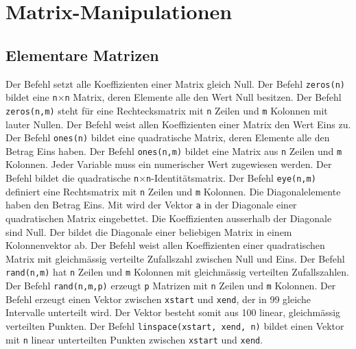 \section{Matrix-Manipulationen}
\subsection{Elementare Matrizen}
Der Befehl  setzt alle Koeffizienten einer Matrix gleich Null. Der Befehl {\color{red}\texttt{zeros(n)}} bildet eine \texttt{n$\times$n} Matrix, deren Elemente alle den Wert Null besitzen. Der Befehl {\color{red}\texttt{zeros(n,m)}} steht für eine Rechtecksmatrix mit \texttt{n} Zeilen und \texttt{m} Kolonnen mit lauter Nullen.
\newline\newline
Der Befehl  weist allen Koeffizienten einer Matrix den Wert Eins zu. Der Befehl {\color{red}\texttt{ones(n)}} bildet eine quadratische Matrix, deren Elemente alle den Betrag Eins haben. Der Befehl {\color{red}\texttt{ones(n,m)}} bildet eine Matrix aus \texttt{n} Zeilen und \texttt{m} Kolonnen. Jeder Variable muss ein numerischer Wert zugewiesen werden.
\newline\newline
Der Befehl  bildet die quadratische \texttt{n$\times$n}-Identitätsmatrix. Der Befehl {\color{red}\texttt{eye(n,m)}} definiert eine Rechtsmatrix mit \texttt{n} Zeilen und \texttt{m} Kolonnen. Die Diagonalelemente haben den Betrag Eins.
\newline\newline
Mit  wird der Vektor \texttt{a} in der Diagonale einer quadratischen Matrix eingebettet. Die Koeffizienten ausserhalb der Diagonale sind Null. Der  bildet die Diagonale einer beliebigen Matrix in einem Kolonnenvektor ab.
\newline\newline
Der Befehl  weist allen Koeffizienten einer quadratischen Matrix mit gleichmässig verteilte Zufallszahl zwischen Null und Eins. Der Befehl {\color{red}\texttt{rand(n,m)}} hat \texttt{n} Zeilen und \texttt{m} Kolonnen mit gleichmässig verteilten Zufallszahlen. Der Befehl {\color{red}\texttt{rand(n,m,p)}} erzeugt \texttt{p} Matrizen mit \texttt{n} Zeilen und \texttt{m} Kolonnen.
\newline\newline
Der Befehl  erzeugt einen Vektor zwischen \texttt{xstart} und \texttt{xend}, der in 99 gleiche Intervalle unterteilt wird. Der Vektor besteht somit aus 100 linear, gleichmässig verteilten Punkten. Der Befehl {\color{red}\texttt{linspace(xstart, xend, n)}} bildet einen Vektor mit \texttt{n} linear unterteilten Punkten zwischen \texttt{xstart} und \texttt{xend}.
